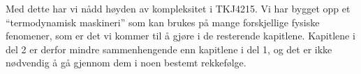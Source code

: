 Med dette har vi nådd høyden av kompleksitet i TKJ4215. Vi har bygget opp et ``termodynamisk maskineri'' som kan brukes på mange forskjellige fysiske fenomener, som er det vi kommer til å gjøre i de resterende kapitlene. Kapitlene i del 2 er derfor mindre sammenhengende enn kapitlene i del 1, og det er ikke nødvendig å gå gjennom dem i noen bestemt rekkefølge.
